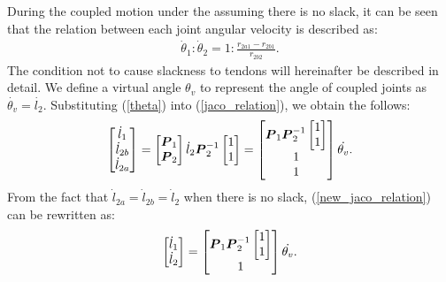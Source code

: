 \documentclass{llncs}
\def\vect#1{\mbox{\boldmath$#1$}}
\begin{document}
During the coupled motion under the assuming there is no slack, it can be seen that the relation between each joint angular velocity is described as:
\begin{align}
	\dot{\theta}_{1}:\dot{\theta}_{2}=1:\frac{r_{2a1}-r_{2b1}}{r_{2b2}}.
\end{align}
The condition not to cause slackness to tendons will hereinafter be described in detail.
We define a virtual angle $\theta_v$ to represent the angle of coupled joints as $\dot{\theta_v}=\dot{l_{2}}$.
Substituting (\ref{theta}) into (\ref{jaco_relation}), we obtain the follows:
\begin{align}
	\begin{bmatrix}
		\dot{l}_{1}\\
		\dot{l}_{2b}\\
		\dot{l}_{2a}
	\end{bmatrix}
	=
	\begin{bmatrix}
	\vect{P}_{1}\\
	\vect{P}_{2}
	\end{bmatrix}
	\dot{l}_{2}\vect{P}_{2}^{-1}
								\begin{bmatrix}
									1\\
									1
								\end{bmatrix}
								=
								\begin{bmatrix}\vect{P}_{1}\vect{P}_{2}^{-1}
																				\begin{bmatrix}
																			1\\
																			1
																				\end{bmatrix}
																			\\
								1\\
								1
								\end{bmatrix}
										\dot{\theta_{v}}.			\label{new_jaco_relation}
\end{align}
From the fact that $\dot{l}_{2a}=\dot{l}_{2b}=\dot{l}_{2}$ when there is no slack, (\ref{new_jaco_relation}) can be rewritten as:
\begin{align}
	\begin{bmatrix}
		\dot{l}_{1}\\
		\dot{l}_{2}
	\end{bmatrix}
	=
	\begin{bmatrix}\vect{P}_{1}\vect{P}_{2}^{-1}
													\begin{bmatrix}
												1\\
												1
													\end{bmatrix}
												\\
	1
	\end{bmatrix}
			\dot{\theta_{v}}.
\end{align}
\end{document}

